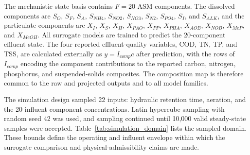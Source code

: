 \documentclass[a4paper,fleqn]{cas-sc}
\begin{document}
The mechanistic state basis contains $F=20$ ASM components. The dissolved components are $S_O$, $S_F$, $S_A$, $S_{NH4}$, $S_{NO2}$, $S_{NO3}$, $S_{N2}$, $S_{PO4}$, $S_I$, and $S_{ALK}$, and the particulate components are $X_I$, $X_S$, $X_H$, $X_{PAO}$, $X_{PP}$, $X_{PHA}$, $X_{AOB}$, $X_{NOB}$, $X_{MeP}$, and $X_{MeOH}$. All surrogate models are trained to predict the 20-component effluent state. The four reported effluent-quality variables, COD, TN, TP, and TSS, are calculated externally as $y=I_{comp}c$ after prediction, with the rows of $I_{comp}$ encoding the component contributions to the reported carbon, nitrogen, phosphorus, and suspended-solids composites. The composition map is therefore common to the raw and projected outputs and to all model families.

The simulation design sampled 22 inputs: hydraulic retention time, aeration, and the 20 influent component concentrations. Latin hypercube sampling with random seed 42 was used, and sampling continued until 10,000 valid steady-state samples were accepted. Table~\ref{tab:simulation_domain} lists the sampled domain. These bounds define the operating and influent envelope within which the surrogate comparison and physical-admissibility claims are made.
\end{document}
